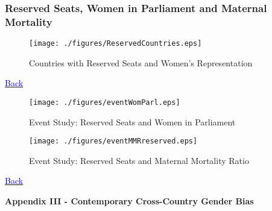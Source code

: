 \documentclass[10pt,letterpaper,subeqn]{beamer}
\begin{document}
\begin{frame}[label=quotaTabs]
  \frametitle{Reserved Seats, Women in Parliament and Maternal Mortality}
  
\end{frame}

\begin{frame}[label=quotaCover]
  \begin{figure}
    \caption{Countries with Reserved Seats and Women's Representation}
    \texttt{[image: ./figures/ReservedCountries.eps]}
  \end{figure}
  \hyperlink{Quotas}{{\footnotesize \textcolor{blue}{Back}}}
\end{frame}

\begin{frame}[label=quotaWP]
  \begin{figure}
    \caption{Event Study: Reserved Seats and Women in Parliament}
    \texttt{[image: ./figures/eventWomParl.eps]}
  \end{figure}
\end{frame}

\begin{frame}[label=quotalnMMR]
  \begin{figure}
    \caption{Event Study: Reserved Seats and Maternal Mortality Ratio}
    \texttt{[image: ./figures/eventMMRreserved.eps]}
  \end{figure}
  \hyperlink{quotaMMR}{{\footnotesize \textcolor{blue}{Back}}}
\end{frame}



\begin{frame}[plain]
\begin{center}
\textbf{Appendix III - Contemporary Cross-Country Gender Bias}
\end{center}
\end{frame}
\end{document}
